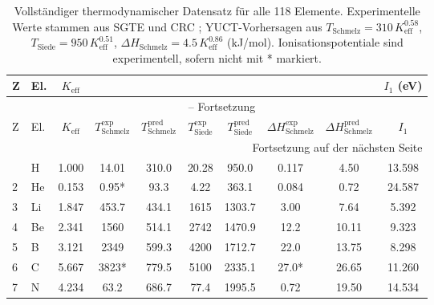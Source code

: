 \documentclass[12pt,a4paper]{article}
\theoremstyle{remark}
\begin{document}
	\setlength{\tabcolsep}{3pt}
	\begin{longtable}{@{}llcccccccc@{}}
		\caption{Vollständiger thermodynamischer Datensatz für alle 118 Elemente.  
			Experimentelle Werte stammen aus SGTE \cite{Dinsdale1991} und CRC \cite{CRC};  
			YUCT-Vorhersagen aus \(T_{\text{Schmelz}} = 310\,K_{\mathrm{eff}}^{0.58}\),  
			\(T_{\text{Siede}} = 950\,K_{\mathrm{eff}}^{0.51}\),  
			\(\Delta H_{\text{Schmelz}} = 4.5\,K_{\mathrm{eff}}^{0.86}\) (kJ/mol).  
			Ionisationspotentiale sind experimentell, sofern nicht mit * markiert.}
		\label{tab:full_118}\\
		\toprule
		Z & El. & \(K_{\mathrm{eff}}\) & 
		\makebox[1.5cm]{\(T_{\text{Schmelz}}^{\text{exp}}\) (K)} & 
		\makebox[1.5cm]{\(T_{\text{Schmelz}}^{\text{pred}}\) (K)} &
		\makebox[1.5cm]{\(T_{\text{Siede}}^{\text{exp}}\) (K)} & 
		\makebox[1.5cm]{\(T_{\text{Siede}}^{\text{pred}}\) (K)} &
		\makebox[1.5cm]{\(\Delta H_{\text{Schmelz}}^{\text{exp}}\) (kJ/mol)} & 
		\makebox[1.5cm]{\(\Delta H_{\text{Schmelz}}^{\text{pred}}\) (kJ/mol)} &
		\(I_1\) (eV) \\
		\midrule
		\endfirsthead
		\multicolumn{10}{c}{\tablename\ \thetable{} -- Fortsetzung} \\
		\toprule
		Z & El. & \(K_{\mathrm{eff}}\) & \(T_{\text{Schmelz}}^{\text{exp}}\) & \(T_{\text{Schmelz}}^{\text{pred}}\) &
		\(T_{\text{Siede}}^{\text{exp}}\) & \(T_{\text{Siede}}^{\text{pred}}\) & \(\Delta H_{\text{Schmelz}}^{\text{exp}}\) & \(\Delta H_{\text{Schmelz}}^{\text{pred}}\) & \(I_1\) \\
		\midrule
		\endhead
		\bottomrule
		\multicolumn{10}{r}{Fortsetzung auf der nächsten Seite} \\
		\endfoot
		\endlastfoot
		1  & H   & 1.000 & 14.01  & 310.0  & 20.28  & 950.0  & 0.117 & 4.50  & 13.598 \\
		2  & He  & 0.153 & 0.95*  & 93.3   & 4.22   & 363.1  & 0.084 & 0.72  & 24.587 \\
		3  & Li  & 1.847 & 453.7  & 434.1  & 1615   & 1303.7 & 3.00  & 7.64  & 5.392 \\
		4  & Be  & 2.341 & 1560   & 514.1  & 2742   & 1470.9 & 12.2  & 10.11 & 9.323 \\
		5  & B   & 3.121 & 2349   & 599.3  & 4200   & 1712.7 & 22.0  & 13.75 & 8.298 \\
		6  & C   & 5.667 & 3823*  & 779.5  & 5100   & 2335.1 & 27.0* & 26.65 & 11.260 \\
		7  & N   & 4.234 & 63.2   & 686.7  & 77.4   & 1995.5 & 0.72  & 19.50 & 14.534 \\

\end{longtable}
\end{document}
